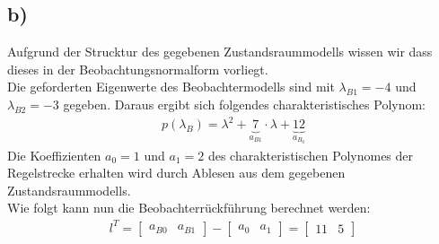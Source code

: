 \documentclass[11pt]{scrartcl} %
\begin{document}
\subsection*{b)}
Aufgrund der Strucktur des gegebenen Zustandsraummodells wissen wir dass dieses in der Beobachtungsnormalform vorliegt.\\
Die geforderten Eigenwerte des Beobachtermodells sind mit $\lambda_{B1}=-4$ und $\lambda_{B2}=-3$ gegeben. Daraus ergibt sich folgendes charakteristisches Polynom:
\begin{align*}
	p(\lambda_B)=\lambda^2+\underbrace{7}_{a_{B1}}\cdot\lambda+\underbrace{12}_{a_{B_0}}
\end{align*}
Die Koeffizienten $a_0=1$ und $a_1=2$ des charakteristischen Polynomes der Regelstrecke erhalten wird durch Ablesen aus dem gegebenen Zustandsraummodells.\\
Wie folgt kann nun die Beobachterrückführung berechnet werden:
\begin{align*}
	l^T=\begin{bmatrix}a_{B0}&a_{B1}\end{bmatrix}-\begin{bmatrix}a_{0}&a_{1}\end{bmatrix}=\begin{bmatrix}11&5\end{bmatrix}
\end{align*}
\end{document}
